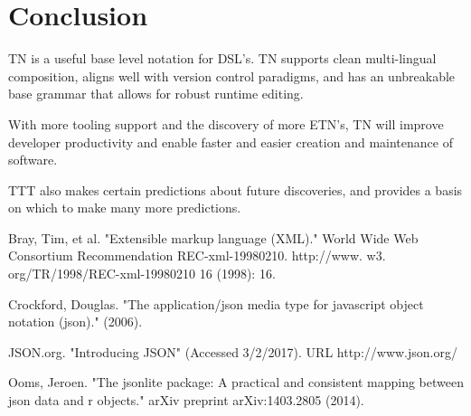 \documentclass[journal]{IEEEtran}
\begin{document}
\section{Conclusion}

TN is a useful base level notation for DSL's. TN supports clean multi-lingual composition, aligns well with version control paradigms, and has an unbreakable base grammar that allows for robust runtime editing.

With more tooling support and the discovery of more ETN's, TN will improve developer productivity and enable faster and easier creation and maintenance of software.

TTT also makes certain predictions about future discoveries, and provides a basis on which to make many more predictions.

\begin{thebibliography}{4}

Bray, Tim, et al. "Extensible markup language (XML)." World Wide Web Consortium Recommendation REC-xml-19980210. http://www. w3. org/TR/1998/REC-xml-19980210 16 (1998): 16.

Crockford, Douglas. "The application/json media type for javascript object notation (json)." (2006).

JSON.org. "Introducing JSON" (Accessed 3/2/2017). URL http://www.json.org/

Ooms, Jeroen. "The jsonlite package: A practical and consistent mapping between json data and r objects." arXiv preprint arXiv:1403.2805 (2014).

\end{thebibliography}

\ifCLASSOPTIONcaptionsoff
  \newpage
\fi
\end{document}
